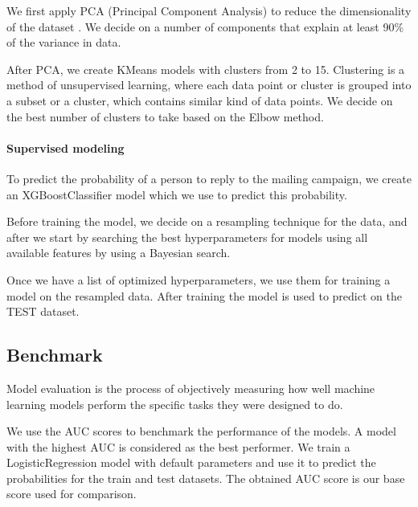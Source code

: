 We first apply PCA (Principal Component Analysis) \cite{PCA} to reduce the dimensionality of the dataset \cite{jonathonshlens2005}. We decide on a number of components that explain at least 90\% of the variance in data. 

After PCA, we create KMeans\cite{KMeans} models with clusters from 2 to 15. Clustering is a method of unsupervised learning, where each data point or cluster is grouped into a subset or a cluster, which contains similar kind of data points. We decide on the best number of clusters to take based on the Elbow\cite{dtpham2004} method.

\paragraph{Supervised modeling}
To predict the probability of a person to reply to the mailing campaign, we create an XGBoostClassifier model which we use to predict this probability.

Before training the model, we decide on a resampling technique for the data, and after we start by searching the best hyperparameters for models using all available features by using a Bayesian search.

Once we have a list of optimized hyperparameters, we use them for training a model on the resampled data.
After training the model is used to predict on the TEST dataset.

\subsection{Benchmark}

Model evaluation is the process of objectively measuring how well machine learning models perform the specific tasks they were designed to do.

We use the AUC scores to benchmark the performance of the models. A model with the highest AUC is considered as the best performer. We train a LogisticRegression model with default parameters and use it to predict the probabilities for the train and test datasets. The obtained AUC score is our base score used for comparison.